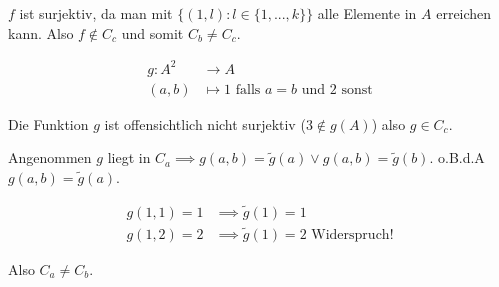 \documentclass[]{article}
\begin{document}
$f$ ist surjektiv, da man mit $\{(1, l): l \in \{1, ..., k\}\}$ alle Elemente in $A$ erreichen kann. Also $f \notin C_c$ und somit $C_b \neq C_c$.


\begin{align*}
	g:A^2 &\rightarrow A\\
	(a, b) &\mapsto 1 \text{ falls } a=b \text{ und } 2 \text{ sonst}
\end{align*}

Die Funktion $g$ ist offensichtlich nicht surjektiv ($3 \notin g(A)$) also $g \in C_c$.

Angenommen $g$ liegt in $C_a \implies g(a,b)=\tilde{g}(a) \lor g(a,b)=\tilde{g}(b)$. o.B.d.A $g(a,b)=\tilde{g}(a)$.

\begin{align*}
	g(1, 1) = 1 &\implies \tilde{g}(1) = 1\\
	g(1, 2) = 2 &\implies \tilde{g}(1) = 2 \text{ Widerspruch!}
\end{align*}

Also $C_a \neq C_b$.
\end{document}
